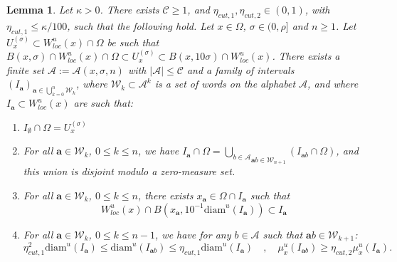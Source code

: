\documentclass[a4paper]{article}
\newtheorem{lemma}[theorem]{Lemma}
\theoremstyle{definition}
\begin{document}
\begin{lemma}
Let $\kappa>0$. There exists $\mathcal{C} \geq 1$, and $\eta_{cut,1},\eta_{cut,2} \in (0,1)$, with $\eta_{cut,1} \leq \kappa/100$, such that the following hold. Let $x \in \Omega$, $\sigma \in (0,\rho]$ and $n \geq 1$. Let $U^{(\sigma)}_{x} \subset W^u_{loc}(x) \cap \Omega$ be such that $B(x,\sigma) \cap W^u_{loc}(x) \cap \Omega \subset U^{(\sigma)}_{x} \subset B(x,10\sigma) \cap W^u_{loc}(x)$. There exists a finite set $\mathcal{A} := \mathcal{A}(x,\sigma,n)$ with $|\mathcal{A}| \leq \mathcal{C}$ and a family of intervals $(I_\mathbf{a})_{\mathbf{a} \in \bigcup_{k=0}^n\mathcal{W}_k}$, where $\mathcal{W}_k \subset \mathcal{A}^k$ is a set of words on the alphabet $\mathcal{A}$, and where $I_{\mathbf{a}} \subset W^u_{loc}(x)$ are such that: 
\begin{enumerate}
    \item $I_{\emptyset} \cap \Omega = U^{(\sigma)}_x$
    \item For all $\mathbf{a} \in \mathcal{W}_k$, $0 \leq k \leq n$, we have $I_{\mathbf{a}} \cap \Omega = \underset{\mathbf{a}b \in \mathcal{W}_{n+1}}{\bigcup_{b \in \mathcal{A}}} (I_{\mathbf{a}b} \cap \Omega)$, and this union is disjoint modulo a zero-measure set.
    \item For all $\mathbf{a} \in \mathcal{W}_k$, $0 \leq k \leq n$, there exists $x_{\mathbf{a}} \in \Omega \cap I_{\mathbf{a}}$ such that $$W^u_{loc}(x) \cap 
  B(x_{\mathbf{a}}, 10^{-1} \text{diam}^u(I_{\mathbf{a}}) ) \subset I_{\mathbf{a}}$$
    \item For all $\mathbf{a} \in \mathcal{W}_k$, $0 \leq k \leq n-1$, we have for any $b \in \mathcal{A}$ such that $\mathbf{a}b \in \mathcal{W}_{k+1}$: $$ \eta_{cut,1}^2 \text{diam}^u(I_\mathbf{a}) \leq \text{diam}^u(I_{\mathbf{a}b}) \leq \eta_{cut,1} \text{diam}^u(I_{\mathbf{a}}) \quad , \quad \mu_x^u(I_{\mathbf{a}b}) \geq \eta_{cut,2} \mu_x^u(I_{\mathbf{a}}).$$
\end{enumerate}
\end{lemma}
\end{document}
